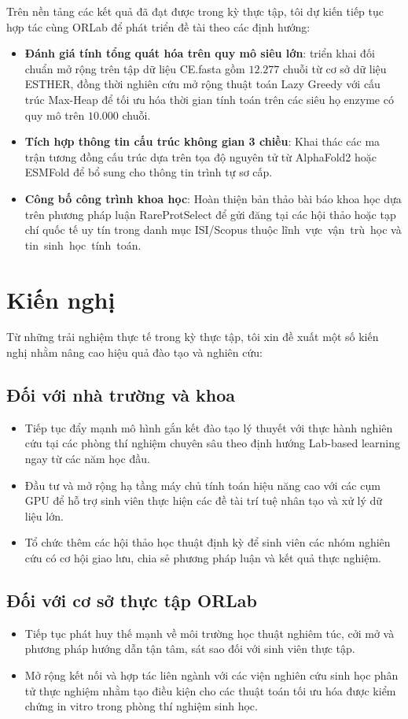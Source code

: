 Trên nền tảng các kết quả đã đạt được trong kỳ thực tập, tôi dự kiến tiếp tục hợp tác cùng ORLab để phát triển đề tài theo các định hướng:
\begin{itemize}
    \item \textbf{Đánh giá tính tổng quát hóa trên quy mô siêu lớn}: triển khai đối chuẩn mở rộng trên tập dữ liệu CE.fasta gồm $12.277$ chuỗi từ cơ sở dữ liệu ESTHER, đồng thời nghiên cứu mở rộng thuật toán Lazy Greedy với cấu trúc Max-Heap để tối ưu hóa thời gian tính toán trên các siêu họ enzyme có quy mô trên $10.000$ chuỗi.
    \item \textbf{Tích hợp thông tin cấu trúc không gian 3 chiều}: Khai thác các ma trận tương đồng cấu trúc dựa trên tọa độ nguyên tử từ AlphaFold2 hoặc ESMFold để bổ sung cho thông tin trình tự sơ cấp.
    \item \textbf{Công bố công trình khoa học}: Hoàn thiện bản thảo bài báo khoa học dựa trên phương pháp luận RareProtSelect để gửi đăng tại các hội thảo hoặc tạp chí quốc tế uy tín trong danh mục ISI/Scopus thuộc lĩnh~vực~vận~trù~học và tin~sinh~học~tính~toán.
\end{itemize}

\section{Kiến nghị}
\label{sec:kien_nghi}

Từ những trải nghiệm thực tế trong kỳ thực tập, tôi xin đề xuất một số kiến nghị nhằm nâng cao hiệu quả đào tạo và nghiên cứu:

\subsection{Đối với nhà trường và khoa}
\begin{itemize}
    \item Tiếp tục đẩy mạnh mô hình gắn kết đào tạo lý thuyết với thực hành nghiên cứu tại các phòng thí nghiệm chuyên sâu theo định hướng Lab-based learning ngay từ các năm học đầu.
    \item Đầu tư và mở rộng hạ tầng máy chủ tính toán hiệu năng cao với các cụm GPU để hỗ trợ sinh viên thực hiện các đề tài trí tuệ nhân tạo và xử lý dữ liệu lớn.
    \item Tổ chức thêm các hội thảo học thuật định kỳ để sinh viên các nhóm nghiên cứu có cơ hội giao lưu, chia sẻ phương pháp luận và kết quả thực nghiệm.
\end{itemize}

\subsection{Đối với cơ sở thực tập ORLab}
\begin{itemize}
    \item Tiếp tục phát huy thế mạnh về môi trường học thuật nghiêm túc, cởi mở và phương pháp hướng dẫn tận tâm, sát sao đối với sinh viên thực tập.
    \item Mở rộng kết nối và hợp tác liên ngành với các viện nghiên cứu sinh học phân tử thực nghiệm nhằm tạo điều kiện cho các thuật toán tối ưu hóa được kiểm chứng in vitro trong phòng thí nghiệm sinh học.
\end{itemize}


